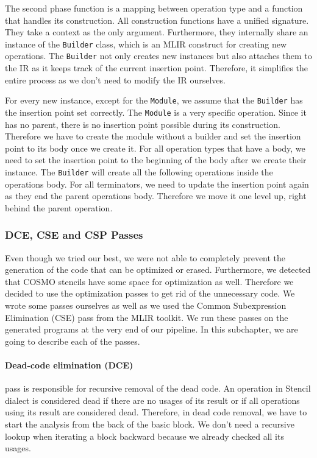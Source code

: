 \documentclass[sigplan,\review anonymous]{acmart}
\begin{document}
The second phase function is a mapping between operation type and a function
that handles its construction. All construction functions have a unified
signature. They take a context as the only argument. Furthermore, they
internally share an instance of the \texttt{Builder} class, which is an MLIR
construct for creating new operations. The \texttt{Builder} not only creates
new instances but also attaches them to the IR as it keeps track of the
current insertion point. Therefore, it simplifies the entire process as we
don't need to modify the IR ourselves.

For every new instance, except for the \texttt{Module}, we assume that the
\texttt{Builder} has the insertion point set correctly. The \texttt{Module}
is a very specific operation. Since it has no parent, there is no insertion
point possible during its construction. Therefore we have to create the module
without a builder and set the insertion point to its body once we create it.
For all operation types that have a body, we need to set the insertion point
to the beginning of the body after we create their instance. The
\texttt{Builder} will create all the following operations inside the operations
body. For all terminators, we need to update the insertion point again as they
end the parent operations body. Therefore we move it one level up, right behind
the parent operation.

\subsubsection{DCE, CSE and CSP Passes}
Even though we tried our best, we were not able to completely prevent the
generation of the code that can be optimized or erased. Furthermore, we
detected that COSMO stencils have some space for optimization as well.
Therefore we decided to use the optimization passes to get rid of the
unnecessary code. We wrote some passes ourselves as well as we used the
Common Subexpression Elimination (CSE) pass from the MLIR toolkit. We run
these passes on the generated programs at the very end of our pipeline.
In this subchapter, we are going to describe each of the passes.

\paragraph{Dead-code elimination (DCE)} pass is responsible for recursive removal of 
the dead code. An operation in Stencil dialect is considered dead if there
are no usages of its result or if all operations using its result are
considered dead. Therefore, in dead code removal, we have to start the
analysis from the back of the basic block. We don't need a recursive lookup
when iterating a block backward because we already checked all its usages.
\end{document}

